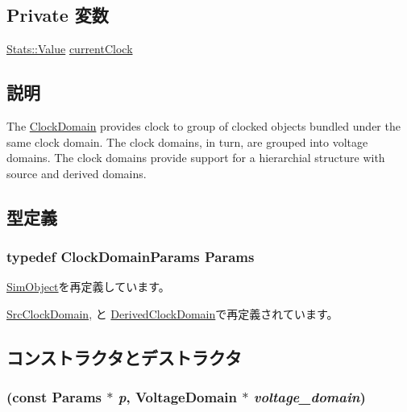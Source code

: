 \subsection*{Private 変数}
\begin{DoxyCompactItemize}
\item 
\hyperlink{classStats_1_1Value}{Stats::Value} \hyperlink{classClockDomain_a0073be3bd6bc1f374821ccaf28afb854}{currentClock}
\end{DoxyCompactItemize}


\subsection{説明}
The \hyperlink{classClockDomain}{ClockDomain} provides clock to group of clocked objects bundled under the same clock domain. The clock domains, in turn, are grouped into voltage domains. The clock domains provide support for a hierarchial structure with source and derived domains. 

\subsection{型定義}
\hypertarget{classClockDomain_a38704c6bd51f0677b46da34c8fe16a38}{
\subsubsection[{Params}]{\setlength{\rightskip}{0pt plus 5cm}typedef ClockDomainParams {\bf Params}}}
\label{classClockDomain_a38704c6bd51f0677b46da34c8fe16a38}


\hyperlink{classSimObject_a0f0761d2db586a23bb2a2880b8f387bb}{SimObject}を再定義しています。

\hyperlink{classSrcClockDomain_a782eceafbcc65d65fa25b7ca97e38b2d}{SrcClockDomain}, と \hyperlink{classDerivedClockDomain_a10c51f81ae9968953f7d5c0ee20546c6}{DerivedClockDomain}で再定義されています。

\subsection{コンストラクタとデストラクタ}
\hypertarget{classClockDomain_aee0135126b7022e7991d8205f6b3a564}{
\subsubsection[{ClockDomain}]{ (const {\bf Params} $\ast$ {\em p}, \/  {\bf VoltageDomain} $\ast$ {\em voltage\_\-domain})}}
\label{classClockDomain_aee0135126b7022e7991d8205f6b3a564}



